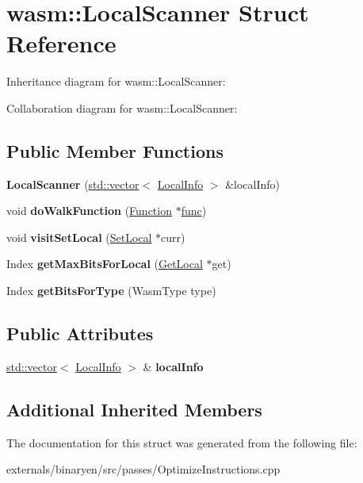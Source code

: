 \hypertarget{structwasm_1_1_local_scanner}{}\section{wasm\+:\+:Local\+Scanner Struct Reference}
\label{structwasm_1_1_local_scanner}


Inheritance diagram for wasm\+:\+:Local\+Scanner\+:


Collaboration diagram for wasm\+:\+:Local\+Scanner\+:
\subsection*{Public Member Functions}
\begin{DoxyCompactItemize}
\item 
\mbox{\label{structwasm_1_1_local_scanner_abad6a2d910a43377f341f31468de2e1f}} 
{\bfseries Local\+Scanner} (\mbox{\hyperlink{classstd_1_1vector}{std\+::vector}}$<$ \mbox{\hyperlink{structwasm_1_1_local_info}{Local\+Info}} $>$ \&local\+Info)
\item 
\mbox{\label{structwasm_1_1_local_scanner_aa3d1c8539b3ff8362c06cd9da3b96fbc}} 
void {\bfseries do\+Walk\+Function} (\mbox{\hyperlink{classwasm_1_1_function}{Function}} $\ast$\mbox{\hyperlink{structfunc}{func}})
\item 
\mbox{\label{structwasm_1_1_local_scanner_af40e9b6cc2bb8a4600211cebb6de54e1}} 
void {\bfseries visit\+Set\+Local} (\mbox{\hyperlink{classwasm_1_1_set_local}{Set\+Local}} $\ast$curr)
\item 
\mbox{\label{structwasm_1_1_local_scanner_a3fe84fb41684aa6f49a0a71cfab6f2dd}} 
Index {\bfseries get\+Max\+Bits\+For\+Local} (\mbox{\hyperlink{classwasm_1_1_get_local}{Get\+Local}} $\ast$get)
\item 
\mbox{\label{structwasm_1_1_local_scanner_ac2b8e522a4aebdb1a42eeb990098abd0}} 
Index {\bfseries get\+Bits\+For\+Type} (Wasm\+Type type)
\end{DoxyCompactItemize}
\subsection*{Public Attributes}
\begin{DoxyCompactItemize}
\item 
\mbox{\label{structwasm_1_1_local_scanner_a3ffb1e075773e72b7e03e685b80c7407}} 
\mbox{\hyperlink{classstd_1_1vector}{std\+::vector}}$<$ \mbox{\hyperlink{structwasm_1_1_local_info}{Local\+Info}} $>$ \& {\bfseries local\+Info}
\end{DoxyCompactItemize}
\subsection*{Additional Inherited Members}


The documentation for this struct was generated from the following file\+:\begin{DoxyCompactItemize}
\item 
externals/binaryen/src/passes/Optimize\+Instructions.\+cpp\end{DoxyCompactItemize}
